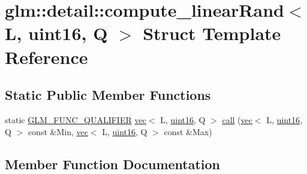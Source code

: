 \hypertarget{structglm_1_1detail_1_1compute__linear_rand_3_01_l_00_01uint16_00_01_q_01_4}{}\section{glm\+:\+:detail\+:\+:compute\+\_\+linear\+Rand$<$ L, uint16, Q $>$ Struct Template Reference}
\label{structglm_1_1detail_1_1compute__linear_rand_3_01_l_00_01uint16_00_01_q_01_4}
\subsection*{Static Public Member Functions}
\begin{DoxyCompactItemize}
\item 
static \mbox{\hyperlink{setup_8hpp_a33fdea6f91c5f834105f7415e2a64407}{G\+L\+M\+\_\+\+F\+U\+N\+C\+\_\+\+Q\+U\+A\+L\+I\+F\+I\+ER}} \mbox{\hyperlink{structglm_1_1vec}{vec}}$<$ L, \mbox{\hyperlink{namespaceglm_1_1detail_a47b2a7d006d187338e8031a352d1ce56}{uint16}}, Q $>$ \mbox{\hyperlink{structglm_1_1detail_1_1compute__linear_rand_3_01_l_00_01uint16_00_01_q_01_4_a26cd13e82c8f2dc14b2efd0a0f46c459}{call}} (\mbox{\hyperlink{structglm_1_1vec}{vec}}$<$ L, \mbox{\hyperlink{namespaceglm_1_1detail_a47b2a7d006d187338e8031a352d1ce56}{uint16}}, Q $>$ const \&Min, \mbox{\hyperlink{structglm_1_1vec}{vec}}$<$ L, \mbox{\hyperlink{namespaceglm_1_1detail_a47b2a7d006d187338e8031a352d1ce56}{uint16}}, Q $>$ const \&Max)
\end{DoxyCompactItemize}


\subsection{Member Function Documentation}
\mbox{\label{structglm_1_1detail_1_1compute__linear_rand_3_01_l_00_01uint16_00_01_q_01_4_a26cd13e82c8f2dc14b2efd0a0f46c459}} 
